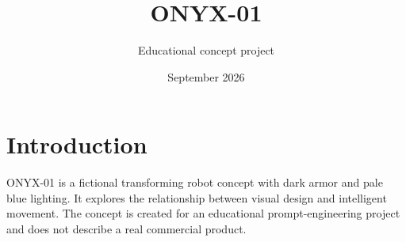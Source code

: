 \documentclass[11pt]{article}
\title{ONYX-01}
\author{Educational concept project}
\date{September 2026}
\begin{document}
\maketitle
\section{Introduction}
ONYX-01 is a fictional transforming robot concept with dark armor and pale blue lighting. It explores the relationship between visual design and intelligent movement. The concept is created for an educational prompt-engineering project and does not describe a real commercial product.
\end{document}
